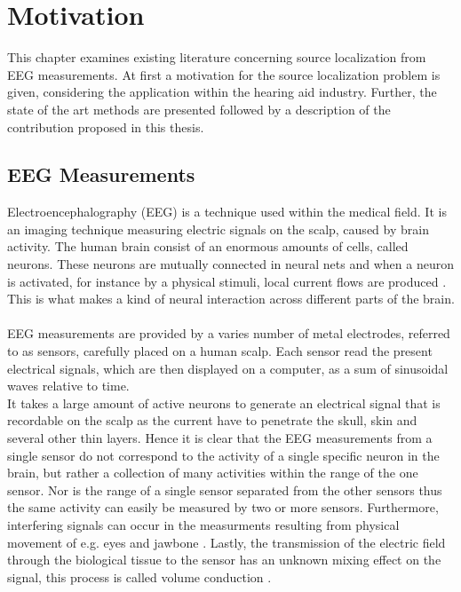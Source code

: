\chapter{Motivation}\label{ch:motivation}
This chapter examines existing literature concerning source localization from EEG measurements. 
At first a motivation for the source localization problem is given, considering the application within the hearing aid industry. 
Further, the state of the art methods are presented followed by a description of the contribution proposed in this thesis.

\section{EEG Measurements}\label{sec:EEG}
Electroencephalography (EEG) is a technique used within the medical field. 
It is an imaging technique measuring electric signals on the scalp, caused by brain activity. 
The human brain consist of an enormous amounts of cells, called neurons. 
These neurons are mutually connected in neural nets and when a neuron is activated, for instance by a physical stimuli, local current flows are produced \cite{fundamentalEEG}. 
This is what makes a kind of neural interaction across different parts of the brain. 
\\ \\
EEG measurements are provided by a varies number of metal electrodes, referred to as sensors, carefully placed on a human scalp. 
Each sensor read the present electrical signals, which are then displayed on a computer, as a sum of sinusoidal waves relative to time.
\\
It takes a large amount of active neurons to generate an electrical signal that is recordable on the scalp as the current have to penetrate the skull, skin and several other thin layers.
Hence it is clear that the EEG measurements from a single sensor do not correspond to the activity of a single specific neuron in the brain, but rather a collection of many activities within the range of the one sensor.
Nor is the range of a single sensor separated from the other sensors thus the same activity can easily be measured by two or more sensors.
Furthermore, interfering signals can occur in the measurments resulting from physical movement of e.g. eyes and jawbone \cite{fundamentalEEG}. 
Lastly, the transmission of the electric field through the biological tissue to the sensor has an unknown mixing effect on the signal, this process is called volume conduction \cite[p. 68]{EEGsignalprocessing} \cite{Van2019}.
